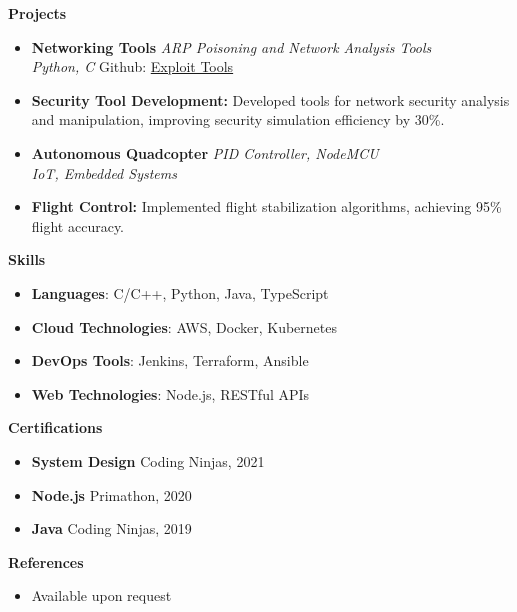 \documentclass[a4paper,11pt]{article}
\newcommand{\cvsection}[1]{
    \vspace{3mm}
    \begin{tcolorbox}[colframe=darkBlue, colback=gray!10, boxrule=0.4mm, width=\dimexpr\textwidth]
        \large \textbf{#1}
    \end{tcolorbox}
    \vspace{-1em}
}
\newcommand{\resumeItem}[2]{\item{\textbf{#1} {#2}}}
\newcommand{\resumeProject}[4]{
  \item{
    \textbf{#1} \hfill \textit{#3}\\
    \textit{#2} \hfill #4
    \vspace{-0.5em}
  }
}
\newcommand{\resumeSkill}[2]{\item \textbf{#1}: #2}
\begin{document}
\cvsection{Projects}
\begin{itemize}[leftmargin=0.5cm, labelsep=0.2cm]
  \resumeProject
    {Networking Tools}{Python, C}
    {ARP Poisoning and Network Analysis Tools}{Github: \href{https://github.com/aaditya889/Exploit-tools-in-C}{Exploit Tools}}
  \resumeItemListStart
    \resumeItem{Security Tool Development:}{Developed tools for network security analysis and manipulation, improving security simulation efficiency by 30\%.}
  \resumeItemListEnd

  \resumeProject
    {Autonomous Quadcopter}{IoT, Embedded Systems}
    {PID Controller, NodeMCU}{}
  \resumeItemListStart
    \resumeItem{Flight Control:}{Implemented flight stabilization algorithms, achieving 95\% flight accuracy.}
  \resumeItemListEnd
\end{itemize}

\cvsection{Skills}
\begin{itemize}[leftmargin=0.5cm, labelsep=0.2cm]
    \resumeSkill{Languages}{C/C++, Python, Java, TypeScript}
    \resumeSkill{Cloud Technologies}{AWS, Docker, Kubernetes}
    \resumeSkill{DevOps Tools}{Jenkins, Terraform, Ansible}
    \resumeSkill{Web Technologies}{Node.js, RESTful APIs}
\end{itemize}

\cvsection{Certifications}
\begin{itemize}[leftmargin=0.5cm, labelsep=0.2cm]
    \resumeItem{System Design}{Coding Ninjas, 2021}
    \resumeItem{Node.js}{Primathon, 2020}
    \resumeItem{Java}{Coding Ninjas, 2019}
\end{itemize}

\cvsection{References}
\begin{itemize}[leftmargin=0.5cm, labelsep=0.2cm]
    \item Available upon request
\end{itemize}
\end{document}
